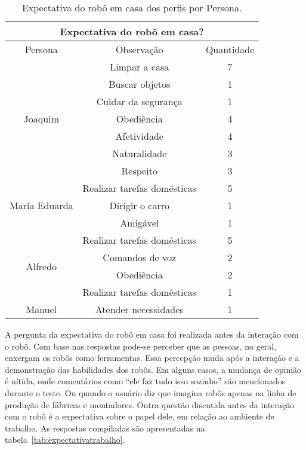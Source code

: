 \begin{table}[!ht]
	\caption{Expectativa do robô em casa dos perfis por Persona.}
	\label{tab:expectativacasa}
	\centering
	\begin{tabular}{c | c | c }
        \hline
        \multicolumn{3}{c}{Expectativa do robô em casa?} \\ \hline
        Persona & Observação & Quantidade \\ \hline
        \multirow{7}{*}{Joaquim} & Limpar a casa & 7 \\
        \hhline{~--}
        & Buscar objetos & 1 \\
        \hhline{~--}
        & Cuidar da segurança & 1 \\
        \hhline{~--}
        & Obediência & 4 \\
        \hhline{~--}
        & Afetividade & 4 \\
        \hhline{~--}
        & Naturalidade & 3 \\
        \hhline{~--}
        & Respeito & 3 \\
        \hline
        \multirow{3}{*}{Maria Eduarda} & Realizar tarefas domésticas & 5 \\
        \hhline{~--}
        & Dirigir o carro & 1 \\
        \hhline{~--}
        & Amigável & 1 \\
        \hline
        \multirow{4}{*}{Alfredo} & Realizar tarefas domésticas & 5 \\
        \hhline{~--}
        & Comandos de voz & 2 \\
        \hhline{~--}
        & Obediência & 2 \\
        \hline
        Danielo & Realizar tarefas domésticas & 1 \\
        \hline
        Manuel & Atender necessidades & 1 \\
        \hline
    \end{tabular}
\end{table}

A pergunta da expectativa do robô em casa foi realizada antes da interação com o robô. Com base nas respostas pode-se perceber que as pessoas, no geral, enxergam os robôs como ferramentas. Essa percepção muda após a interação e a demonstração das habilidades dos robôs. Em alguns casos, a mudança de opinião é nítida, onde comentários como ``ele faz tudo isso sozinho'' são mencionados durante o teste. Ou quando o usuário diz que imagina robôs apenas na linha de produção de fábricas e montadores. Outra questão discutida antes da interação com o robô é a expectativa sobre o papel dele, em relação ao ambiente de trabalho. As respostas compiladas são apresentadas na tabela~\ref{tab:expectativatrabalho}.


